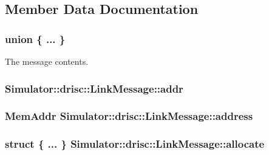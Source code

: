 \subsection{Member Data Documentation}
\hypertarget{struct_simulator_1_1drisc_1_1_link_message_a3882c0cf26f4477fe02ee2fe9971dfc0}{\subsubsection[{"@44}]{\setlength{\rightskip}{0pt plus 5cm}union \{ ... \} }}\label{struct_simulator_1_1drisc_1_1_link_message_a3882c0cf26f4477fe02ee2fe9971dfc0}


The message contents. 

\hypertarget{struct_simulator_1_1drisc_1_1_link_message_a37977bcb182ff99e5f3b756aef13517a}{
\subsubsection[{addr}]{ Simulator\+::drisc\+::\+Link\+Message\+::addr}}\label{struct_simulator_1_1drisc_1_1_link_message_a37977bcb182ff99e5f3b756aef13517a}
\hypertarget{struct_simulator_1_1drisc_1_1_link_message_adb4efb41e06557b9c28fbfc9f5485d74}{
\subsubsection[{address}]{\setlength{\rightskip}{0pt plus 5cm}Mem\+Addr Simulator\+::drisc\+::\+Link\+Message\+::address}}\label{struct_simulator_1_1drisc_1_1_link_message_adb4efb41e06557b9c28fbfc9f5485d74}
\hypertarget{struct_simulator_1_1drisc_1_1_link_message_a19b5bdeb4b2f40e09d3591050bfeb8f6}{
\subsubsection[{allocate}]{\setlength{\rightskip}{0pt plus 5cm}struct \{ ... \}   Simulator\+::drisc\+::\+Link\+Message\+::allocate}}\label{struct_simulator_1_1drisc_1_1_link_message_a19b5bdeb4b2f40e09d3591050bfeb8f6}
